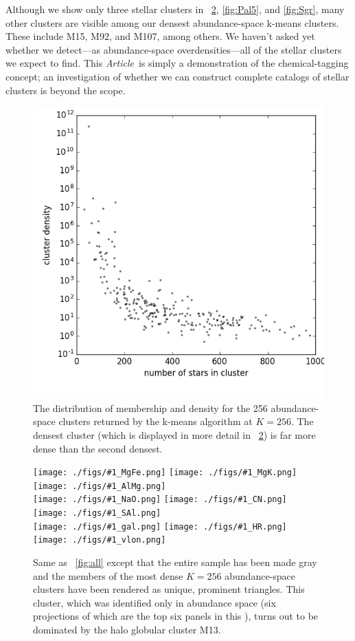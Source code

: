 \documentclass[12pt, letterpaper, preprint]{aastex}
\newcommand{\documentname}{\textsl{Article}}
\newlength{\figwidth}\setlength{\figwidth}{0.3\textwidth}
\newcommand{\insanefigure}[1]{%
\texttt{[image: ./figs/\#1\_MgFe.png]}%
\texttt{[image: ./figs/\#1\_MgK.png]}%
\texttt{[image: ./figs/\#1\_AlMg.png]}\\
\texttt{[image: ./figs/\#1\_NaO.png]}%
\texttt{[image: ./figs/\#1\_CN.png]}%
\texttt{[image: ./figs/\#1\_SAl.png]}\\
\texttt{[image: ./figs/\#1\_gal.png]}%
\texttt{[image: ./figs/\#1\_HR.png]}\\
\texttt{[image: ./figs/\#1\_vlon.png]}}
\begin{document}
Although we show only three stellar clusters in
\figurename~\ref{fig:M13}, \ref{fig:Pal5}, and \ref{fig:Sgr}, many
other clusters are visible among our densest abundance-space k-means
clusters.
These include M15, M92, and M107, among others.
We haven't asked yet whether we detect---as abundance-space
overdensities---all of the stellar clusters we expect to find.
This \documentname\ is simply a demonstration of the chemical-tagging
concept; an investigation of whether we can construct complete
catalogs of stellar clusters is beyond the scope.

\begin{figure}[!bp]
\includegraphics[width=1.5\figwidth]{./figs/clusters_0256.png}
\caption{The distribution of membership and density for the 256
  abundance-space clusters returned by the k-means algorithm at
  $K=256$.  The densest cluster (which is displayed in more detail in 
  \figurename~\ref{fig:M13}) is far more dense than the second
  densest.\label{fig:densities}}
\end{figure}
\begin{figure}[!p]
\insanefigure{cluster_0256_0253}
\caption{Same as \figurename~\ref{fig:all} except that the entire
  sample has been made gray and the members of the most dense
  $K=256$ abundance-space clusters have been rendered as unique, prominent triangles.
  This cluster, which was identified only in abundance space (six
  projections of which are the top six panels in this \figurename),
  turns out to be dominated by the halo globular cluster
  M13.\label{fig:M13}}
\end{figure}
\end{document}
